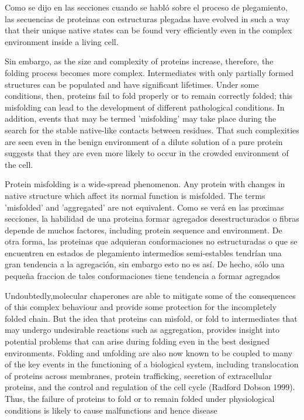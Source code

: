 Como se dijo en las secciones cuando se habló sobre el proceso de plegamiento, las secuencias de proteinas con estructuras plegadas have evolved in such a way that their unique native states 
can be found very efficiently even in the complex environment inside a living cell.


Sin embargo, as the size and complexity of proteins increase, therefore, the folding process becomes more complex. 
Intermediates with only partially formed structures can be populated and have significant lifetimes. 
Under some conditions, then, proteins fail to fold properly or to remain correctly folded; this misfolding can lead to the development of different pathological conditions.
In addition, events that may be termed 'misfolding' may take place during the search for the stable native-like contacts between residues. 
That such complexities are seen even in the benign environment of a dilute solution of a pure protein suggests that they are even more likely to occur in the crowded environment of the cell.

Protein misfolding is a wide-spread phenomenon. Any protein with changes in native structure which affect its normal function is misfolded. 
The terms 'misfolded' and 'aggregated' are not equivalent. Como se verá en las proximas secciones, la habilidad de una proteina formar agregados desestructurados o fibras depende de muchos factores, including protein sequence and environment.
De otra forma, las proteinas que adquieran conformaciones no estructuradas o que se encuentren en estados de plegamiento intermedios semi-estables tendrían una gran tendencia a la agregación, sin embargo esto no es así. 
De hecho, sólo una pequeña fraccion de tales conformaciones tiene tendencia a formar agregados


Undoubtedly,molecular chaperones are able to mitigate some of the consequences of this complex behaviour and provide some protection for the incompletely folded chain. 
But the idea that proteins can misfold, or fold to intermediates that may undergo undesirable reactions such as aggregation, provides insight into potential problems that can arise during folding even in the best designed environments.
Folding and unfolding are also now known to be coupled to many of the key events in the functioning of a biological system, including translocation of proteins across membranes, protein trafficking, 
secretion of extracellular proteins, and the control and regulation of the cell cycle (Radford  Dobson 1999).
Thus, the failure of proteins to fold or to remain folded under physiological conditions is likely to cause malfunctions and hence disease






